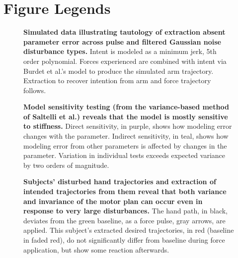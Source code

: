 \documentclass[10pt]{article}
\begin{document}


\section*{Figure Legends}

\begin{figure}[!ht]
\begin{center}
\end{center}
\caption{
{\bf Simulated data illustrating tautology of extraction absent parameter error across pulse and filtered Gaussian noise disturbance types.} Intent is modeled as a minimum jerk, 5th order polynomial. Forces experienced are combined with intent via Burdet et al.'s \cite{burdet2006stability} model to produce the simulated arm trajectory. Extraction to recover intention from arm and force trajectory follows.
}
\label{fig:synthetic}
\end{figure}

\begin{figure}[!ht]
\begin{center}
\end{center}
\caption{
{\bf Model sensitivity testing (from the variance-based method of Saltelli et al.\cite{saltelli2010variance}) reveals that the model is mostly sensitive to stiffness.} Direct sensitivity, in purple, shows how modeling error changes with the parameter. Indirect sensitivity, in teal, shows how modeling error from other parameters is affected by changes in the parameter. Variation in individual tests exceeds expected variance by two orders of magnitude.
}
\label{fig:sensitivity}
\end{figure}

\begin{figure}[!ht]
\begin{center}
\end{center}
\caption{
{\bf Subjects' disturbed hand trajectories and extraction of intended trajectories from them reveal that both variance and invariance of the motor plan can occur even in response to very large disturbances.} The hand path, in black, deviates from the green baseline, as a force pulse, gray arrows, are applied. This subject's extracted desired trajectories, in red (baseline in faded red), do not significantly differ from baseline during force application, but show some reaction afterwards.
}
\label{fig:anecdotes}
\end{figure}
\end{document}
